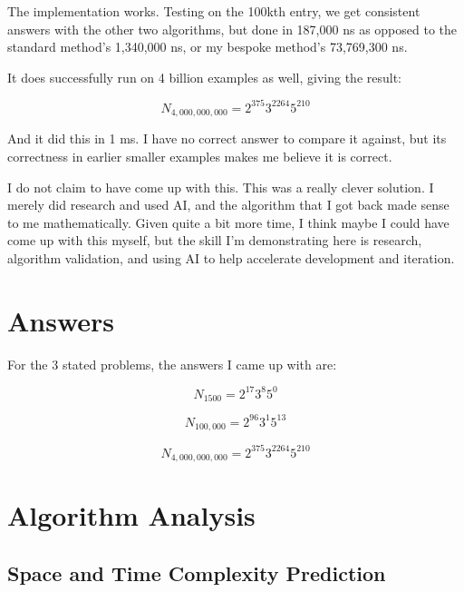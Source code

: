\documentclass{article}
\begin{document}
The implementation works. Testing on the 100kth entry, we get consistent answers with the other two algorithms, but done in 187,000 ns as opposed to the standard method's 1,340,000 ns, or my bespoke method's 73,769,300 ns. \newline

It does successfully run on 4 billion examples as well, giving the result:

\begin{equation}
    N_{4,000,000,000} = 2^{375} 3^{2264} 5^{210}
\end{equation}

And it did this in 1 ms. I have no correct answer to compare it against, but its correctness in earlier smaller examples makes me believe it is correct. \newline

I do not claim to have come up with this. This was a really clever solution. I merely did research and used AI, and the algorithm that I got back made sense to me mathematically. Given quite a bit more time, I think maybe I could have come up with this myself, but the skill I'm demonstrating here is research, algorithm validation, and using AI to help accelerate development and iteration.

\newpage

\section{Answers}

For the 3 stated problems, the answers I came up with are:

\begin{equation}
    N_{1500} = 2^{17} 3^{8} 5^{0}
\end{equation}

\begin{equation}
    N_{100,000} = 2^{96} 3^{1} 5^{13}
\end{equation}

\begin{equation}
    N_{4,000,000,000} = 2^{375} 3^{2264} 5^{210}
\end{equation}

\newpage

\section{Algorithm Analysis}

\subsection{Space and Time Complexity Prediction}
\end{document}
